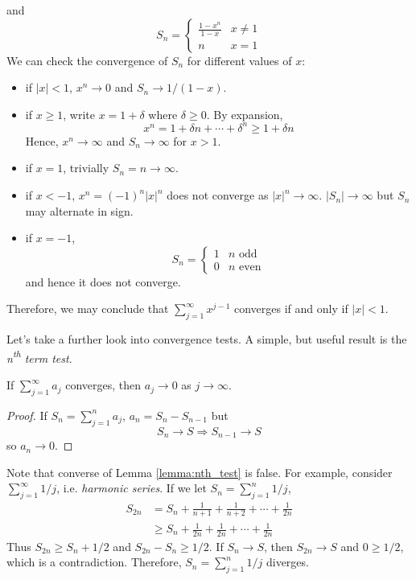 \documentclass[10pt, a4paper, twoside]{report}
\begin{document}
and 
\[S_n=\begin{cases}
    \frac{1-x^n}{1-x} & x\neq 1 \\
    n & x=1
\end{cases}\]
We can check the convergence of \(S_n\) for different values of \(x\):
\begin{itemize}
    \item if \(|x|<1\), \(x^n\to 0\) and \(S_n\to 1/(1-x)\). 
    \item if \(x\geq 1\), write \(x=1+\delta\) where \(\delta\geq 0\). By expansion,
    \[x^n=1+\delta n+\cdots+\delta^n\geq 1+\delta n\]
    Hence, \(x^n\to\infty\) and \(S_n\to\infty\) for \(x>1\).
    \item if \(x=1\), trivially \(S_n=n\to\infty\).
    \item if \(x<-1\), \(x^n=(-1)^n|x|^n\) does not converge as \(|x|^n\to\infty\). \(|S_n|\to\infty\) but \(S_n\) may alternate in sign.
    \item if \(x=-1\), 
    \[S_n=\begin{cases}
        1 & n\text{ odd} \\
        0 & n\text{ even}
    \end{cases}\]
    and hence it does not converge.
\end{itemize}
Therefore, we may conclude that \(\sum_{j=1}^{\infty}x^{j-1}\) converges if and only if \(|x|<1\).

Let's take a further look into convergence tests. A simple, but useful result is the \emph{n{\textsuperscript{th}} term test}.
\begin{lemma}
    If \(\sum_{j=1}^{\infty}a_j\) converges, then \(a_j\to 0\) as \(j\to\infty\).
    \label{lemma:nth_test}
\end{lemma}

\begin{proof}
    If \(S_n=\sum_{j=1}^{n}a_j\), \(a_n=S_n-S_{n-1}\) but
    \[S_n\to S\Rightarrow S_{n-1}\to S\]
    so \(a_n\to 0\).
\end{proof}
Note that converse of Lemma \ref{lemma:nth_test} is false. For example, consider \(\sum_{j=1}^{\infty}1/j\), i.e. \emph{harmonic series}. If we let \(S_n=\sum_{j=1}^{n}1/j\),
\begin{align*}
    S_{2n}&=S_n+\frac{1}{n+1}+\frac{1}{n+2}+\cdots +\frac{1}{2n} \\
    &\geq S_n+\frac{1}{2n}+\frac{1}{2n}+\cdots +\frac{1}{2n}
\end{align*}
Thus \(S_{2n}\geq S_n+1/2\) and \(S_{2n}-S_n\geq 1/2\). If \(S_n\to S\), then \(S_{2n}\to S\) and \(0\geq 1/2\), which is a contradiction. Therefore, \(S_n=\sum_{j=1}^{n}1/j\) diverges. 
\end{document}
